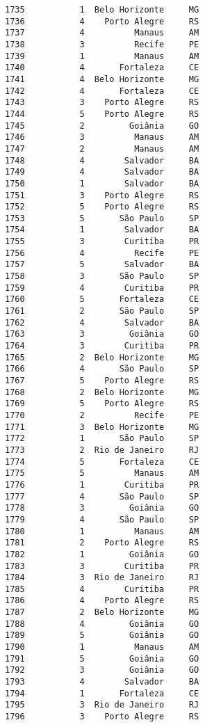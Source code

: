 \documentclass[11pt]{article}
\begin{document}
\begin{Verbatim}[commandchars=\\\{\}]
1735           1  Belo Horizonte     MG  
1736           4    Porto Alegre     RS  
1737           4          Manaus     AM  
1738           3          Recife     PE  
1739           1          Manaus     AM  
1740           4       Fortaleza     CE  
1741           4  Belo Horizonte     MG  
1742           4       Fortaleza     CE  
1743           3    Porto Alegre     RS  
1744           5    Porto Alegre     RS  
1745           2         Goiânia     GO  
1746           3          Manaus     AM  
1747           2          Manaus     AM  
1748           4        Salvador     BA  
1749           4        Salvador     BA  
1750           1        Salvador     BA  
1751           3    Porto Alegre     RS  
1752           5    Porto Alegre     RS  
1753           5       São Paulo     SP  
1754           1        Salvador     BA  
1755           3        Curitiba     PR  
1756           4          Recife     PE  
1757           5        Salvador     BA  
1758           3       São Paulo     SP  
1759           4        Curitiba     PR  
1760           5       Fortaleza     CE  
1761           2       São Paulo     SP  
1762           4        Salvador     BA  
1763           3         Goiânia     GO  
1764           3        Curitiba     PR  
1765           2  Belo Horizonte     MG  
1766           4       São Paulo     SP  
1767           5    Porto Alegre     RS  
1768           2  Belo Horizonte     MG  
1769           5    Porto Alegre     RS  
1770           2          Recife     PE  
1771           3  Belo Horizonte     MG  
1772           1       São Paulo     SP  
1773           2  Rio de Janeiro     RJ  
1774           5       Fortaleza     CE  
1775           5          Manaus     AM  
1776           1        Curitiba     PR  
1777           4       São Paulo     SP  
1778           3         Goiânia     GO  
1779           4       São Paulo     SP  
1780           1          Manaus     AM  
1781           2    Porto Alegre     RS  
1782           1         Goiânia     GO  
1783           3        Curitiba     PR  
1784           3  Rio de Janeiro     RJ  
1785           4        Curitiba     PR  
1786           4    Porto Alegre     RS  
1787           2  Belo Horizonte     MG  
1788           4         Goiânia     GO  
1789           5         Goiânia     GO  
1790           1          Manaus     AM  
1791           5         Goiânia     GO  
1792           3         Goiânia     GO  
1793           4        Salvador     BA  
1794           1       Fortaleza     CE  
1795           3  Rio de Janeiro     RJ  
1796           3    Porto Alegre     RS  

\end{Verbatim}
\end{document}
